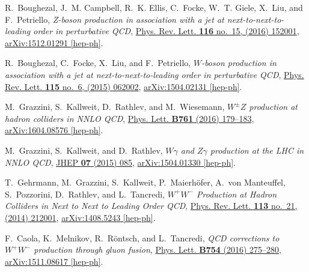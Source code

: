 \documentclass[a4paper,12pt]{scrartcl}
\begin{document}
\begin{thebibliography}{10}
R.~Boughezal, J.~M. Campbell, R.~K. Ellis, C.~Focke, W.~T. Giele, X.~Liu, and
  F.~Petriello, {\em {Z-boson production in association with a jet at
  next-to-next-to-leading order in perturbative QCD}},
  \href{http://dx.doi.org/10.1103/PhysRevLett.116.152001}{Phys. Rev. Lett.
  {\bfseries 116} no.~15, (2016) 152001},
\href{http://arxiv.org/abs/1512.01291}{{\ttfamily arXiv:1512.01291 [hep-ph]}}.

R.~Boughezal, C.~Focke, X.~Liu, and F.~Petriello, {\em {$W$-boson production in
  association with a jet at next-to-next-to-leading order in perturbative
  QCD}}, \href{http://dx.doi.org/10.1103/PhysRevLett.115.062002}{Phys. Rev.
  Lett. {\bfseries 115} no.~6, (2015) 062002},
\href{http://arxiv.org/abs/1504.02131}{{\ttfamily arXiv:1504.02131 [hep-ph]}}.

M.~Grazzini, S.~Kallweit, D.~Rathlev, and M.~Wiesemann, {\em {$W^{\pm}Z$
  production at hadron colliders in NNLO QCD}},
  \href{http://dx.doi.org/10.1016/j.physletb.2016.08.017}{Phys. Lett.
  {\bfseries B761} (2016) 179--183},
\href{http://arxiv.org/abs/1604.08576}{{\ttfamily arXiv:1604.08576 [hep-ph]}}.

M.~Grazzini, S.~Kallweit, and D.~Rathlev, {\em {$W\gamma$ and $Z\gamma$
  production at the LHC in NNLO QCD}},
  \href{http://dx.doi.org/10.1007/JHEP07(2015)085}{JHEP {\bfseries 07} (2015)
  085},
\href{http://arxiv.org/abs/1504.01330}{{\ttfamily arXiv:1504.01330 [hep-ph]}}.

T.~Gehrmann, M.~Grazzini, S.~Kallweit, P.~Maierhöfer, A.~von Manteuffel,
  S.~Pozzorini, D.~Rathlev, and L.~Tancredi, {\em {$W^+W^-$ Production at
  Hadron Colliders in Next to Next to Leading Order QCD}},
  \href{http://dx.doi.org/10.1103/PhysRevLett.113.212001}{Phys. Rev. Lett.
  {\bfseries 113} no.~21, (2014) 212001},
\href{http://arxiv.org/abs/1408.5243}{{\ttfamily arXiv:1408.5243 [hep-ph]}}.

F.~Caola, K.~Melnikov, R.~Röntsch, and L.~Tancredi, {\em {QCD corrections to
  $W^+W^-$ production through gluon fusion}},
  \href{http://dx.doi.org/10.1016/j.physletb.2016.01.046}{Phys. Lett.
  {\bfseries B754} (2016) 275--280},
\href{http://arxiv.org/abs/1511.08617}{{\ttfamily arXiv:1511.08617 [hep-ph]}}.


\end{thebibliography}
\end{document}
